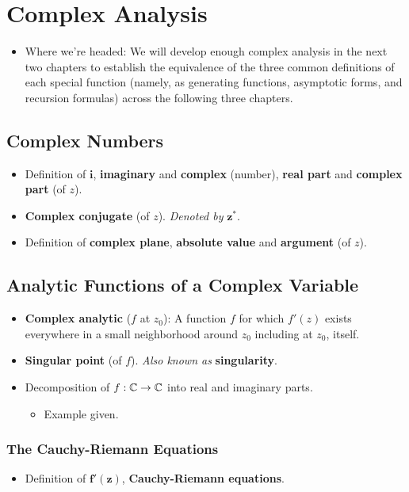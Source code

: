 \documentclass[../finalProject.tex]{subfiles}
\begin{document}
\section{Complex Analysis}\label{sch:7}
\begin{itemize}
    \item {}Where we're headed: We will develop enough complex analysis in the next two chapters to establish the equivalence of the three common definitions of each special function (namely, as generating functions, asymptotic forms, and recursion formulas) across the following three chapters.
\end{itemize}


\subsection{Complex Numbers}
\begin{itemize}
    \item Definition of $\bm{i}$, \textbf{imaginary} and \textbf{complex} (number), \textbf{real part} and \textbf{complex part} (of $z$).
    \item \textbf{Complex conjugate} (of $z$). \emph{Denoted by} $\bm{z^*}$.
    \item Definition of \textbf{complex plane}, \textbf{absolute value} and \textbf{argument} (of $z$).
\end{itemize}


\subsection{Analytic Functions of a Complex Variable}
\begin{itemize}
    \item \textbf{Complex analytic} ($f$ at $z_0$): A function $f$ for which $f'(z)$ exists everywhere in a small neighborhood around $z_0$ including at $z_0$, itself.
    \item \textbf{Singular point} (of $f$). \emph{Also known as} \textbf{singularity}.
    \item Decomposition of $f:\mathbb{C}\to\mathbb{C}$ into real and imaginary parts.
    \begin{itemize}
        \item Example given.
    \end{itemize}
\end{itemize}

\subsubsection{The Cauchy-Riemann Equations}
\begin{itemize}
    \item Definition of $\bm{f'(z)}$, \textbf{Cauchy-Riemann equations}.
\end{itemize}
\end{document}
